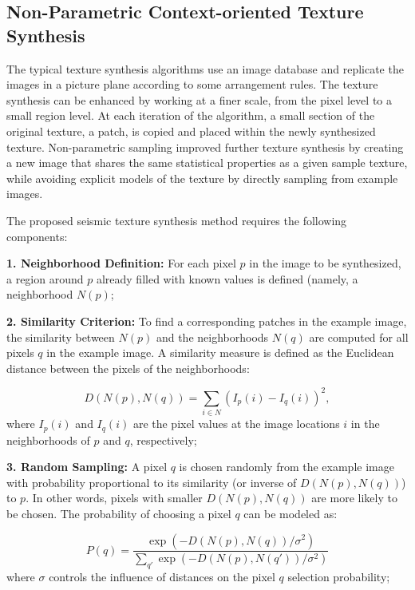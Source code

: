 \documentclass{ieeeaccess}
\begin{document}
\subsection{Non-Parametric Context-oriented Texture Synthesis}

The typical texture synthesis algorithms use an image database and replicate the images in a picture plane according to some arrangement rules. The texture synthesis can be enhanced by working at a finer scale, from the pixel level to a small region level. At each iteration of the algorithm, a small section of the original texture, a patch, is copied and placed within the newly synthesized texture. Non-parametric sampling \cite{ref12} improved further texture synthesis by creating a new image that shares the same statistical properties as a given sample texture, while avoiding explicit models of the texture by directly sampling from example images.

The proposed seismic texture synthesis method requires the following components:

\textbf{1. Neighborhood Definition:} For each pixel $p$ in the image to be synthesized, a region around $p$ already filled with known values is defined (namely, a neighborhood $N(p)$;

\textbf{2. Similarity Criterion:} To find a corresponding patches in the example image, the similarity between $N(p)$ and the neighborhoods $N(q)$ are computed for all pixels $q$ in the example image. A similarity measure is defined as the Euclidean distance between the pixels of the neighborhoods:

\begin{equation}
D(N(p), N(q)) = \sum_{i \in N} \left( I_p(i) - I_q(i) \right)^2,
\end{equation}
where $I_p(i)$ and $I_q(i)$ are the pixel values at the image locations $i$ in the neighborhoods of $p$ and $q$, respectively;

\textbf{3. Random Sampling:} A pixel $q$ is chosen randomly from the example image with probability proportional to its similarity (or inverse of $D(N(p), N(q))$) to $p$. In other words, pixels with smaller $D(N(p), N(q))$ are more likely to be chosen. The probability of choosing a pixel $q$ can be modeled as:

\begin{equation}
P(q) = \frac{\exp(-D(N(p), N(q)) / \sigma^2)}{\sum_{q'} \exp(-D(N(p), N(q')) / \sigma^2)}
\end{equation}
where $\sigma$ controls the influence of distances on the pixel $q$ selection probability;
\end{document}
